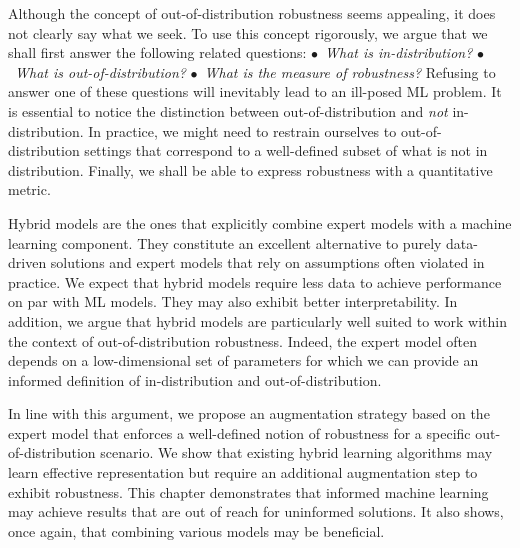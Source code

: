 Although the concept of out-of-distribution robustness seems appealing, it does not clearly say what we seek. To use this concept rigorously, we argue that we shall first answer the following related questions: $\bullet$~\textit{What is in-distribution?} $\bullet$~\textit{What is out-of-distribution?}  $\bullet$~\textit{What is the measure of robustness?} Refusing to answer one of these questions will inevitably lead to an ill-posed ML problem. It is essential to notice the distinction between out-of-distribution and \textit{not} in-distribution. In practice, we might need to restrain ourselves to out-of-distribution settings that correspond to a well-defined subset of what is not in distribution. Finally, we shall be able to express robustness with a quantitative metric.

Hybrid models are the ones that explicitly combine expert models with a machine learning component. They constitute an excellent alternative to purely data-driven solutions and expert models that rely on assumptions often violated in practice. We expect that hybrid models require less data to achieve performance on par with ML models. They may also exhibit better interpretability. In addition, we argue that hybrid models are particularly well suited to work within the context of out-of-distribution robustness. Indeed, the expert model often depends on a low-dimensional set of parameters for which we can provide an informed definition of in-distribution and out-of-distribution.

In line with this argument, we propose an augmentation strategy based on the expert model that enforces a well-defined notion of robustness for a specific out-of-distribution scenario. We show that existing hybrid learning algorithms may learn effective representation but require an additional augmentation step to exhibit robustness. This chapter demonstrates that informed machine learning may achieve results that are out of reach for uninformed solutions. It also shows, once again, that combining various models may be beneficial.

